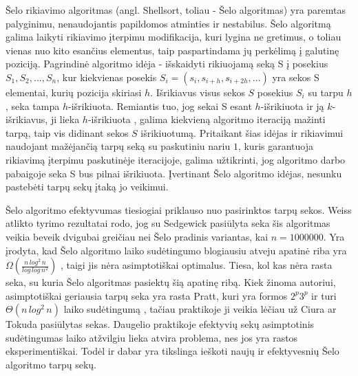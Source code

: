 \documentclass{VUMIFInfKursinis}
\begin{document}
Šelo rikiavimo algoritmas (angl. Shellsort, toliau - Šelo algoritmas) \cite{10.1145/368370.368387} yra paremtas palyginimu, nenaudojantis papildomos atminties ir nestabilus.
Šelo algoritmą galima laikyti rikiavimo įterpimu modifikacija,
kuri lygina ne gretimus, o toliau vienas nuo kito esančius elementus, taip paspartindama jų perkėlimą į galutinę poziciją.
Pagrindinė algoritmo idėja - išskaidyti rikiuojamą seką S į posekius $S_1, S_2, ..., S_n$,
kur kiekvienas posekis $S_i = (s_i, s_{i+h}, s_{i+2h}, ...)$ yra sekos S elementai, kurių pozicija skiriasi $h$.
Išrikiavus visus sekos $S$ posekius $S_i$ su tarpu $h$, seka tampa $h$-išrikiuota.
Remiantis tuo, jog sekai S esant $h$-išrikiuota ir ją $k$-išrikiavus, ji lieka $h$-išrikiuota \cite{GALE1972103},
galima kiekvieną algoritmo iteraciją mažinti tarpą, taip vis didinant sekos $S$ išrikiuotumą.
Pritaikant šias idėjas ir rikiavimui naudojant mažėjančią tarpų seką su paskutiniu nariu $1$,
kuris garantuoja rikiavimą įterpimu paskutinėje iteracijoje,
galima užtikrinti, jog algoritmo darbo pabaigoje seka S bus pilnai išrikiuota.
Įvertinant Šelo algoritmo idėjas, nesunku pastebėti tarpų sekų įtaką jo veikimui.

Šelo algoritmo efektyvumas tiesiogiai priklauso nuo pasirinktos tarpų sekos.
Weiss atlikto tyrimo \cite{weiss1991short} rezultatai rodo, jog su Sedgewick pasiūlyta seka
šis algoritmas veikia beveik dvigubai greičiau nei Šelo pradinis variantas, kai $n = 1000000$.
Yra įrodyta, kad Šelo algoritmo laiko sudėtingumo blogiausiu atveju apatinė riba yra
$\Omega(\frac{n\,log^2\,n}{log\,log\,n^2})$ \cite{267769}, taigi jis nėra asimptotiškai optimalus.
Tiesa, kol kas nėra rasta seka, su kuria Šelo algoritmas pasiektų šią apatinę ribą.
Kiek žinoma autoriui, asimptotiškai geriausia tarpų seka yra rasta Pratt, kuri yra formos
$2^p3^p$ ir turi $\Theta(n\,log^2\,n)$ laiko sudėtingumą \cite{pratt1972shellsort},
tačiau praktikoje ji veikia lėčiau už Ciura \cite{ciura2001best} ar Tokuda \cite{10.5555/645569.659879} pasiūlytas sekas.
Daugelio praktikoje efektyvių sekų asimptotinis sudėtingumas laiko atžvilgiu lieka atvira problema,
nes jos yra rastos eksperimentiškai.
Todėl ir dabar yra tikslinga ieškoti naujų ir efektyvesnių Šelo algoritmo tarpų sekų.
\end{document}
